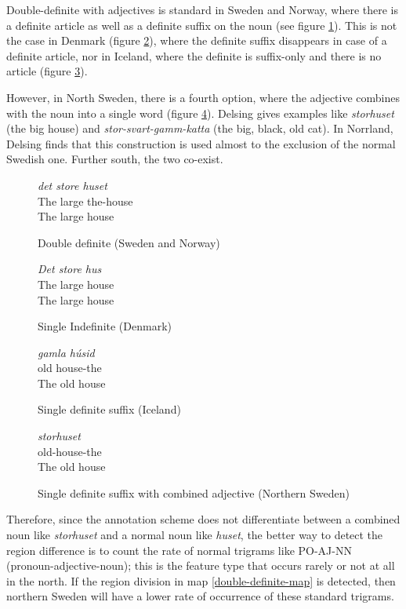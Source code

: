 Double-definite with adjectives is standard in Sweden and Norway,
where there is a definite article as well as a definite suffix on the
noun (see figure \ref{double-definite-example}). This is not the case
in Denmark (figure \ref{single-definite-example}), where the definite
suffix disappears in case of a definite article, nor in Iceland, where
the definite is suffix-only and there is no article (figure
\ref{single-definite-suffix-example}).

However, in North Sweden, there is a fourth option, where the
adjective combines with the noun into a single word (figure
\ref{adjective-single-definite-suffix-example}). Delsing gives
examples like {\it storhuset} (the big house) and {\it
  stor-svart-gamm-katta} (the big, black, old cat). In Norrland,
Delsing finds that this construction is used almost to the exclusion
of the normal Swedish one. Further south, the two co-exist.

\begin{figure}
  {\it det store huset} \\
  The large the-house \\
  The large house
  \caption{Double definite (Sweden and Norway)}
  \label{double-definite-example}
\end{figure}
\begin{figure}
  {\it Det store hus} \\
  The large house\\
  The large house
  \caption{Single Indefinite (Denmark)}
  \label{single-definite-example}
\end{figure}
\begin{figure}
  {\it gamla h\'usid} \\
  old house-the \\
  The old house
  \caption{Single definite suffix (Iceland)}
  \label{single-definite-suffix-example}
\end{figure}
\begin{figure}
  {\it storhuset} \\
  old-house-the \\
  The old house
  \caption{Single definite suffix with combined adjective (Northern Sweden)}
  \label{adjective-single-definite-suffix-example}
\end{figure}

Therefore, since the annotation scheme does not differentiate between
a combined noun like {\it storhuset} and a normal noun like {\it
  huset}, the better way to detect the region difference is to count
the rate of normal trigrams like PO-AJ-NN (pronoun-adjective-noun);
this is the feature type that occurs rarely or not at all in the
north. If the region division in map \ref{double-definite-map} is
detected, then northern Sweden will have a lower rate of occurrence of
these standard trigrams.

